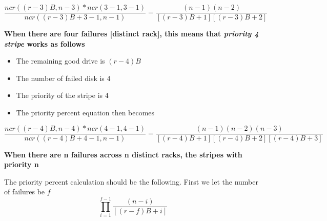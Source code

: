 \documentclass[journal]{IEEEtran}
\begin{document}
\begin{equation*}
  \frac{ncr((r-3)B, n-3)*ncr(3-1, 3-1)}{ncr((r-3)B+3-1, n-1)}=\frac{(n-1)(n-2)}{[(r-3)B+1][(r-3)B+2]}
\end{equation*}

\textbf{When there are four failures [distinct rack], this means that \textit{priority 4 stripe} works as follows}
\begin{itemize}
  \item The remaining good drive is $(r-4)B$
  \item The number of failed disk is 4
  \item The priority of the stripe is 4
  \item The priority percent equation then becomes
\end{itemize}

\begin{equation*}
  \frac{ncr((r-4)B, n-4)*ncr(4-1, 4-1)}{ncr((r-4)B+4-1, n-1)}=\frac{(n-1)(n-2)(n-3)}{[(r-4)B+1][(r-4)B+2][(r-4)B+3]}
\end{equation*}

\textbf{When there are n failures across n distinct racks, the stripes with priority n}

The priority percent calculation should be the following. First we let the number of failures be $f$
\begin{equation*}
  \prod_{i=1}^{f-1}\frac{(n-i)}{[(r-f)B+i]}
\end{equation*}

\newpage
\singlespacing 
\end{document}
